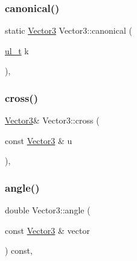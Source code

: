 \subsubsection{\texorpdfstring{canonical()}{canonical()}}
{\footnotesize\ttfamily static \mbox{\hyperlink{class_vector3}{Vector3}} Vector3\+::canonical (\begin{DoxyParamCaption}\item[{\mbox{\hyperlink{group___n_algebra_ga1b140a2034db3f5dfe18a987745df43a}{ul\+\_\+t}}}]{k }\end{DoxyParamCaption})\hspace{0.3cm}{\ttfamily [inline]}, {\ttfamily [static]}}

\mbox{\label{class_vector3_ab4221b101df67f562347dde6738c66fc}} 
\subsubsection{\texorpdfstring{cross()}{cross()}}
{\footnotesize\ttfamily \mbox{\hyperlink{class_vector3}{Vector3}}\& Vector3\+::cross (\begin{DoxyParamCaption}\item[{const \mbox{\hyperlink{class_vector3}{Vector3}} \&}]{u }\end{DoxyParamCaption})\hspace{0.3cm}{\ttfamily [inline]}, {\ttfamily [protected]}}

\mbox{\label{class_vector3_a4ec864436ebac499950f4c06091688db}} 
\subsubsection{\texorpdfstring{angle()}{angle()}}
{\footnotesize\ttfamily double Vector3\+::angle (\begin{DoxyParamCaption}\item[{const \mbox{\hyperlink{class_vector3}{Vector3}} \&}]{vector }\end{DoxyParamCaption}) const\hspace{0.3cm}{\ttfamily [inline]}, {\ttfamily [protected]}}

\mbox{\label{class_vector3_a98422ceb8200829cea11bdeb6417daba}} 
